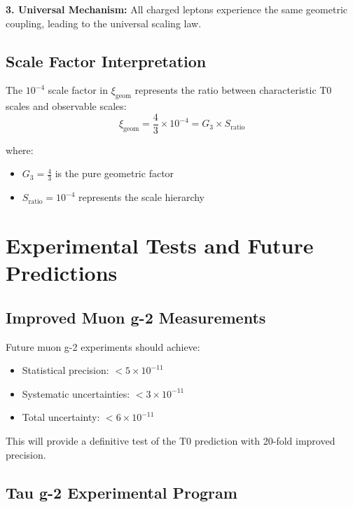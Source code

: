 \documentclass[12pt,a4paper]{report}
\newcommand{\xigeom}{\xi_{\text{geom}}}   %
\begin{document}
\textbf{3. Universal Mechanism:}
All charged leptons experience the same geometric coupling, leading to the universal scaling law.

\subsection{Scale Factor Interpretation}
\label{subsec:scale_factor}

The $10^{-4}$ scale factor in $\xigeom$ represents the ratio between characteristic T0 scales and observable scales:
\begin{equation}
	\xigeom = \frac{4}{3} \times 10^{-4} = G_3 \times S_{\text{ratio}}
	\label{eq:scale_interpretation}
\end{equation}

where:
\begin{itemize}
	\item $G_3 = \frac{4}{3}$ is the pure geometric factor
	\item $S_{\text{ratio}} = 10^{-4}$ represents the scale hierarchy
\end{itemize}

\section{Experimental Tests and Future Predictions}
\label{sec:experimental_tests}

\subsection{Improved Muon g-2 Measurements}
\label{subsec:improved_muon_measurements}

Future muon g-2 experiments should achieve:
\begin{itemize}
	\item Statistical precision: $< 5 \times 10^{-11}$
	\item Systematic uncertainties: $< 3 \times 10^{-11}$
	\item Total uncertainty: $< 6 \times 10^{-11}$
\end{itemize}

This will provide a definitive test of the T0 prediction with 20-fold improved precision.

\subsection{Tau g-2 Experimental Program}
\label{subsec:tau_g2_program}
\end{document}
